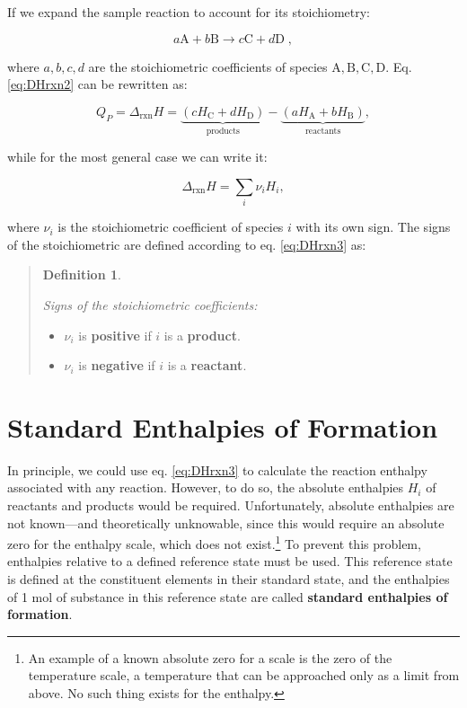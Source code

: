 \documentclass[
  9pt,
]{extbook}
\providecommand{\tightlist}{%
  \setlength{\itemsep}{0pt}\setlength{\parskip}{0pt}}
\theoremstyle{definition}
\newtheorem{definition}{Definition}[chapter]
\theoremstyle{definition}
\theoremstyle{definition}
\theoremstyle{definition}
\theoremstyle{remark}
\begin{document}
If we expand the sample reaction to account for its stoichiometry:

\[ a\mathrm{A} + b\mathrm{B} \rightarrow c\mathrm{C} + d\mathrm{D}\; , \]

where \(a,b,c,d\) are the stoichiometric coefficients of species \(\mathrm{A,B,C,D}\). Eq. \eqref{eq:DHrxn2} can be rewritten as:

\begin{equation}
  Q_P = \Delta_{\text{rxn}} H = \underbrace{\left( cH_{\mathrm{C}}+dH_{\mathrm{D}} \right) }_{\text{products}} - \underbrace{ \left( aH_{\mathrm{A}}+bH_{\mathrm{B}} \right)}_{\text{reactants}},
  \label{eq:DHrxn3}
\end{equation}

while for the most general case we can write it:

\begin{equation}
  \Delta_{\text{rxn}} H = \sum_i \nu_i H_i,
  \label{eq:DHrxn4}
\end{equation}

where \(\nu_i\) is the stoichiometric coefficient of species \(i\) with its own sign. The signs of the stoichiometric are defined according to eq. \eqref{eq:DHrxn3} as:

\begin{quote}
\begin{definition}
\protect\hypertarget{def:nui}{}\label{def:nui}

\emph{Signs of the stoichiometric coefficients:}

\begin{itemize}
\tightlist
\item
  \(\nu_i\) is \textbf{positive} if \(i\) is a \textbf{product}.
\item
  \(\nu_i\) is \textbf{negative} if \(i\) is a \textbf{reactant}.
\end{itemize}

\end{definition}
\end{quote}

\section{Standard Enthalpies of Formation}\label{formenthalpy}

In principle, we could use eq. \eqref{eq:DHrxn3} to calculate the reaction enthalpy associated with any reaction. However, to do so, the absolute enthalpies \(H_i\) of reactants and products would be required. Unfortunately, absolute enthalpies are not known---and theoretically unknowable, since this would require an absolute zero for the enthalpy scale, which does not exist.\footnote{An example of a known absolute zero for a scale is the zero of the temperature scale, a temperature that can be approached only as a limit from above. No such thing exists for the enthalpy.} To prevent this problem, enthalpies relative to a deﬁned reference state must be used. This reference state is defined at the constituent elements in their standard state, and the enthalpies of 1 mol of substance in this reference state are called \textbf{standard enthalpies of formation}.
\end{document}

